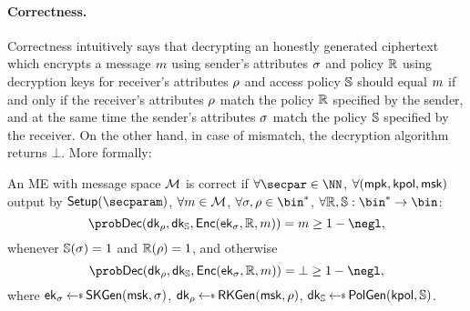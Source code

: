 \paragraph*{Correctness.} Correctness intuitively says that decrypting an honestly generated ciphertext which encrypts a message $m$ using sender's attributes $\sigma$ and policy $\mathbb{R}$ using decryption keys for receiver's attributes $\rho$ and access policy $\mathbb{S}$ should equal $m$ if and only if the receiver's attributes $\rho$ match the policy $\mathbb{R}$ specified by the sender, and at the same time the sender's attributes $\sigma$ match the policy $\mathbb{S}$ specified by the receiver. On the other hand, in case of mismatch, the decryption algorithm returns $\bot$.
More formally:
\begin{definition}[Correctness of ME]\label{def:me_correctness}
    An ME with message space $\mathcal{M}$ is correct if $\forall\secpar\in\NN$, $\forall (\mathsf{mpk}, \mathsf{kpol}, \mathsf{msk})$ output by $\setup(\secparam)$,
    $\forall m \in \mathcal{M}$, $\forall \sattr,\rattr \in \bin^*$,
    $\forall \raccess,\saccess:\bin^*\rightarrow\bin$:
    \[
        \Prob{\dec(\dk_{\rattr}, \dk_{\saccess}, \enc(\ek_{\sattr}, \raccess, \msg)) = \msg} \geq 1 - \negl,
    \]
    whenever $\mathbb{S}(\sigma)=1$ and $\mathbb{R}(\rho)=1$, and otherwise
    \[
        \Prob{\dec(\dk_{\rattr}, \dk_{\saccess}, \enc(\ek_{\sattr}, \raccess, \msg)) = \bot} \geq 1 - \negl,
    \]
    where $\ek_{\sattr} \getsr \skgen(\msk, \sattr)$, $\dk_{\rattr} \getsr \rkgen(\allowbreak\msk, \rattr)$, $\dk_{\saccess} \getsr \polgen(\kpol, \saccess)$.
\end{definition}

